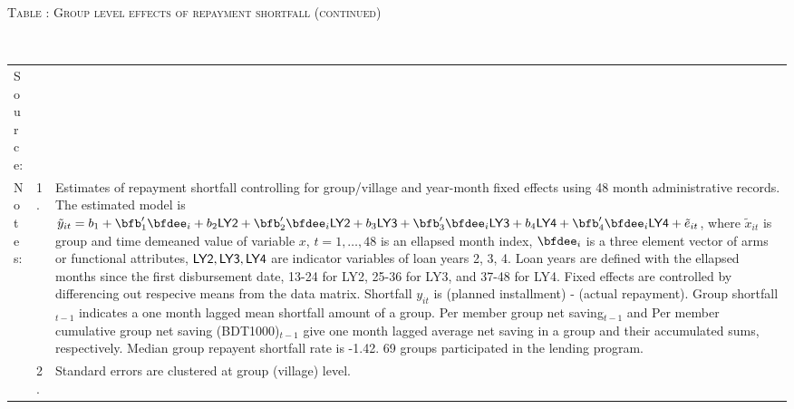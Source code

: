 \addtocounter{table}{-1}
\hspace{-1cm}\begin{minipage}[t]{14cm}
\hfil\textsc{\normalsize Table \thetable: Group level effects of repayment shortfall (continued)\label{tab shortfall group3}}\\
\setlength{\tabcolsep}{1pt}
\setlength{\baselineskip}{8pt}
\renewcommand{\arraystretch}{.6}
\hfil{}\\
\renewcommand{\arraystretch}{.8}
\setlength{\tabcolsep}{1pt}
\begin{tabular}{>{\hfill\scriptsize}p{1cm}<{}>{\hfill\scriptsize}p{.25cm}<{}>{\scriptsize}p{12cm}<{\hfill}}
Source:& \multicolumn{2}{l}{\scriptsize Estimated with GUK administrative data.}\\
Notes: & 1. & Estimates of repayment shortfall controlling for group/village and year-month fixed effects using 48 month administrative records. The estimated model is $\tilde{y}_{it}=b_{1}+\bfb'_{1}\bfdee_{i}+b_{2}\mbox{\textsf{LY2}}+\bfb'_{2}\bfdee_{i}\mbox{\textsf{LY2}}+b_{3}\mbox{\textsf{LY3}}+\bfb'_{3}\bfdee_{i}\mbox{\textsf{LY3}}+b_{4}\mbox{\textsf{LY4}}+\bfb'_{4}\bfdee_{i}\mbox{\textsf{LY4}}+\tilde{e}_{it}$, where $\tilde{x}_{it}$ is group and time demeaned value of variable $x$, $t=1,\dots, 48$ is an ellapsed month index, $\bfdee_{i}$ is a three element vector of arms or functional attributes, $\mbox{\textsf{LY2}}, \mbox{\textsf{LY3}}, \mbox{\textsf{LY4}}$ are indicator variables of loan years 2, 3, 4. Loan years are defined with the ellapsed months since the first disbursement date, 13-24 for \textsf{LY2}, 25-36 for \textsf{LY3}, and 37-48 for \textsf{LY4}. Fixed effects are controlled by differencing out respecive means from the data matrix. Shortfall $y_{it}$ is (planned installment) - (actual repayment). \textsf{Group shortfall}$_{t-1}$ indicates a one month lagged mean shortfall amount of a group. \textsf{Per member group net saving}$_{t-1}$ and \textsf{Per member cumulative group net saving (BDT1000)}$_{t-1}$ give one month lagged average net saving in a group and their accumulated sums, respectively. Median group repayent shortfall rate is -1.42. 69 groups participated in the lending program. \\
& 2. & Standard errors are clustered at group (village) level.
\end{tabular}
\end{minipage}

